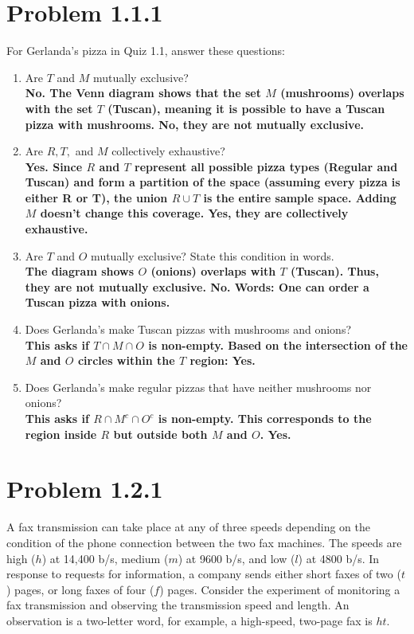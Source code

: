 \documentclass{article}
\begin{document}
\section*{Problem 1.1.1}
For Gerlanda's pizza in Quiz 1.1, answer these questions:
\begin{enumerate}[label=(\alph*)]
    \item Are $T$ and $M$ mutually exclusive? \\[1em]
    {\boldmath\textbf{No. The Venn diagram shows that the set $M$ (mushrooms) overlaps with the set $T$ (Tuscan), meaning it is possible to have a Tuscan pizza with mushrooms. No, they are not mutually exclusive.}}
    
    \item Are $R, T,$ and $M$ collectively exhaustive? \\[1em]
    {\boldmath\textbf{Yes. Since $R$ and $T$ represent all possible pizza types (Regular and Tuscan) and form a partition of the space (assuming every pizza is either R or T), the union $R \cup T$ is the entire sample space. Adding $M$ doesn't change this coverage. Yes, they are collectively exhaustive.}}
    
    \item Are $T$ and $O$ mutually exclusive? State this condition in words. \\[1em]
    {\boldmath\textbf{The diagram shows $O$ (onions) overlaps with $T$ (Tuscan). Thus, they are not mutually exclusive. No. Words: One can order a Tuscan pizza with onions.}}
    
    \item Does Gerlanda's make Tuscan pizzas with mushrooms and onions? \\[1em]
    {\boldmath\textbf{This asks if $T \cap M \cap O$ is non-empty. Based on the intersection of the $M$ and $O$ circles within the $T$ region: Yes.}}
    
    \item Does Gerlanda's make regular pizzas that have neither mushrooms nor onions? \\[1em]
    {\boldmath\textbf{This asks if $R \cap M^c \cap O^c$ is non-empty. This corresponds to the region inside $R$ but outside both $M$ and $O$. Yes.}}
\end{enumerate}

\newpage

\section*{Problem 1.2.1}
A fax transmission can take place at any of three speeds depending on the condition of the phone connection between the two fax machines. The speeds are high ($h$) at 14,400 b/s, medium ($m$) at 9600 b/s, and low ($l$) at 4800 b/s. In response to requests for information, a company sends either short faxes of two ($t$) pages, or long faxes of four ($f$) pages. Consider the experiment of monitoring a fax transmission and observing the transmission speed and length. An observation is a two-letter word, for example, a high-speed, two-page fax is $ht$.
\end{document}
